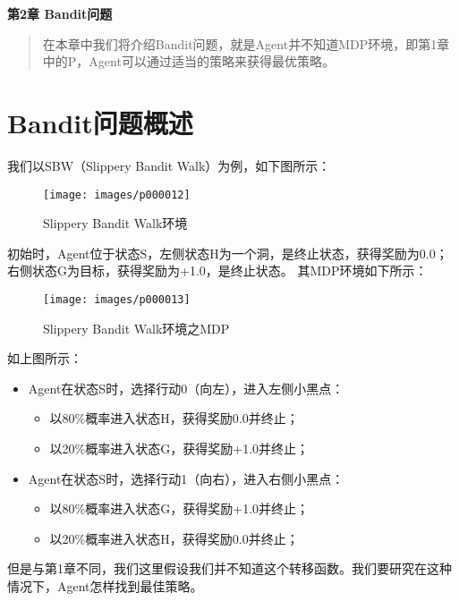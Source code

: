 \newpage
\maketitle
\begin{center}
\Large \textbf{第2章 Bandit问题} \quad 
\end{center}
\begin{abstract}
在本章中我们将介绍Bandit问题，就是Agent并不知道MDP环境，即第1章中的P，Agent可以通过适当的策略来获得最优策略。
\end{abstract}
\section{Bandit问题概述}
我们以SBW（Slippery Bandit Walk）为例，如下图所示：
\begin{figure}[H]
	\caption{Slippery Bandit Walk环境}
	\label{p000012}
	\centering
	\texttt{[image: images/p000012]}
\end{figure}
初始时，Agent位于状态S，左侧状态H为一个洞，是终止状态，获得奖励为0.0；右侧状态G为目标，获得奖励为+1.0，是终止状态。
其MDP环境如下所示：
\begin{figure}[H]
	\caption{Slippery Bandit Walk环境之MDP}
	\label{p000013}
	\centering
	\texttt{[image: images/p000013]}
\end{figure}
如上图所示：
\begin{itemize}
    \item Agent在状态S时，选择行动0（向左），进入左侧小黑点：
    \begin{itemize}
        \item 以80\%概率进入状态H，获得奖励0.0并终止；
        \item 以20\%概率进入状态G，获得奖励+1.0并终止；
    \end{itemize}
    \item Agent在状态S时，选择行动1（向右），进入右侧小黑点：
    \begin{itemize}
        \item 以80\%概率进入状态G，获得奖励+1.0并终止；
        \item 以20\%概率进入状态H，获得奖励0.0并终止；
    \end{itemize}
\end{itemize}
但是与第1章不同，我们这里假设我们并不知道这个转移函数。我们要研究在这种情况下，Agent怎样找到最佳策略。
